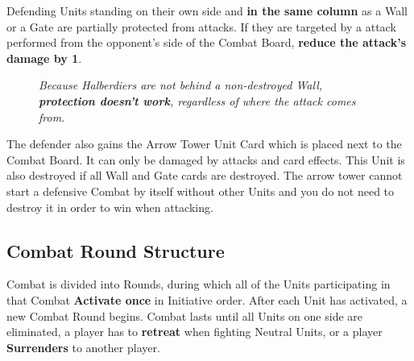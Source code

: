Defending Units standing on their own side and \textbf{in the same column} as a Wall or a Gate are partially protected from  attacks.
If they are targeted by a  attack performed from the opponent's side of the Combat Board, \textbf{reduce the attack's damage by 1}.
\begin{figure}[h]
  \mbox{}%
  \hfill%
  \begin{minipage}[t]{0.4\textwidth}
    \centering
  \caption[halberdiers protected]{\textit{Halberdiers are behind a non-destroyed Gate, they \textbf{are protected} when attacked from spaces 1-8.}}
  \end{minipage}
  \hfill%
  \begin{minipage}[t]{0.4\textwidth}
    \centering
  \caption[halberdiers unprotected]{\textit{Because Halberdiers are not behind a non-destroyed Wall, \textbf{protection doesn't work}, regardless of where the  attack comes from.}}
  \end{minipage}
  \hfill%
  \mbox{}%
\end{figure}

The defender also gains the Arrow Tower Unit Card which is placed next to the Combat Board.
It can only be damaged by  attacks and card effects.
This Unit is also destroyed if all Wall and Gate cards are destroyed.
The arrow tower cannot start a defensive Combat by itself without other Units and you do not need to destroy it in order to win when attacking.

\clearpage

\subsection*{Combat Round Structure}
Combat is divided into Rounds, during which all of the Units participating in that Combat \textbf{Activate once} in Initiative order.
After each Unit has activated, a new Combat Round begins.
Combat lasts until all Units on one side are eliminated, a player has to \textbf{retreat} when fighting Neutral Units, or a player \textbf{Surrenders} to another player.

